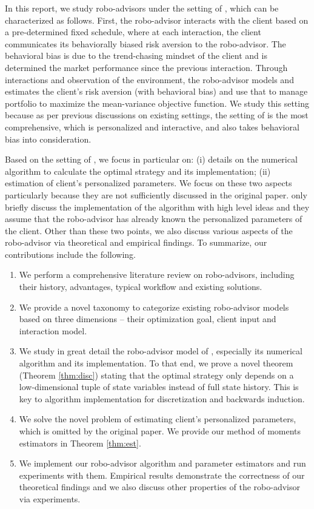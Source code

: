 In this report, we study robo-advisors under the setting of , which can be characterized as follows. First, the robo-advisor interacts with the client based on a pre-determined fixed schedule, where at each interaction, the client communicates its behaviorally biased risk aversion to the robo-advisor. The behavioral bias is due to the trend-chasing mindset of the client and is determined the market performance since the previous interaction. Through interactions and observation of the environment, the robo-advisor models and estimates the client's risk aversion (with behavioral bias) and use that to manage portfolio to maximize the mean-variance objective function. We study this setting because as per previous discussions on existing settings, the setting of  is the most comprehensive, which is personalized and interactive, and also takes behavioral bias into consideration.

Based on the setting of , we focus in particular on: (i) details on the numerical algorithm to calculate the optimal strategy and its implementation; (ii) estimation of client's personalized parameters. We focus on these two aspects particularly because they are not sufficiently discussed in the original paper.  only briefly discuss the implementation of the algorithm with high level ideas and they assume that the robo-advisor has already known the personalized parameters of the client. Other than these two points, we also discuss various aspects of the robo-advisor via theoretical and empirical findings. To summarize, our contributions include the following.\begin{enumerate}
    \item We perform a comprehensive literature review on robo-advisors, including their history, advantages, typical workflow and existing solutions.
    \item We provide a novel taxonomy to categorize existing robo-advisor models based on three dimensions -- their optimization goal, client input and interaction model.
    \item We study in great detail the robo-advisor model of , especially its numerical algorithm and its implementation. To that end, we prove a novel theorem (Theorem \ref{thm:disc}) stating that the optimal strategy only depends on a low-dimensional tuple of state variables instead of full state history. This is key to algorithm implementation for discretization and backwards induction.
    \item We solve the novel problem of estimating client's personalized parameters, which is omitted by the original paper. We provide our method of moments estimators in Theorem \ref{thm:est}.
    \item We implement our robo-advisor algorithm and parameter estimators and run experiments with them. Empirical results demonstrate the correctness of our theoretical findings and we also discuss other properties of the robo-advisor via experiments.
\end{enumerate}

